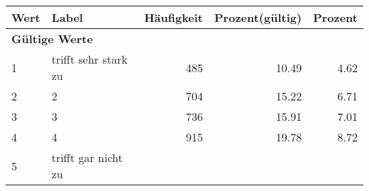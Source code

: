      \begin{longtable}{lXrrr}
     \toprule
     \textbf{Wert} & \textbf{Label} & \textbf{Häufigkeit} & \textbf{Prozent(gültig)} & \textbf{Prozent} \\
     \endhead
     \midrule
     \multicolumn{5}{l}{\textbf{Gültige Werte}}\\

     1 &
     \multicolumn{1}{X}{ trifft sehr stark zu   } &


       \num{485} &
       \num[round-mode=places,round-precision=2]{10.49} &
         \num[round-mode=places,round-precision=2]{4.62} \\

     2 &
     \multicolumn{1}{X}{ 2   } &


       \num{704} &
       \num[round-mode=places,round-precision=2]{15.22} &
         \num[round-mode=places,round-precision=2]{6.71} \\

     3 &
     \multicolumn{1}{X}{ 3   } &


       \num{736} &
       \num[round-mode=places,round-precision=2]{15.91} &
         \num[round-mode=places,round-precision=2]{7.01} \\

     4 &
     \multicolumn{1}{X}{ 4   } &


       \num{915} &
       \num[round-mode=places,round-precision=2]{19.78} &
         \num[round-mode=places,round-precision=2]{8.72} \\

     5 &
     \multicolumn{1}{X}{ trifft gar nicht zu   } &



\end{longtable}

